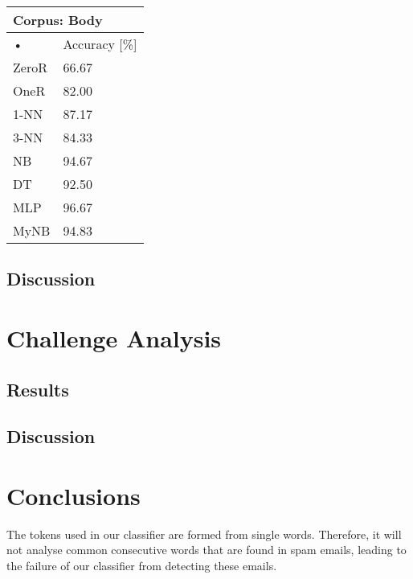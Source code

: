 \documentclass[10pt, a4paper]{article}
\begin{document}
\begin{tabular}{|l|l|}
\hline
\multicolumn{2}{|l|}{Corpus: Body} \\
\hline
• & Accuracy [\%] \\
\hline
ZeroR & 66.67 \\
\hline
OneR & 82.00 \\
\hline
1-NN & 87.17 \\
\hline
3-NN & 84.33 \\
\hline
NB & 94.67 \\
\hline
DT & 92.50 \\
\hline
MLP & 96.67 \\
\hline
MyNB & 94.83 \\
\hline
\end{tabular}

\subsection{Discussion}


\section{Challenge Analysis}


\subsection{Results}

\subsection{Discussion}

\section{Conclusions}

The tokens used in our classifier are formed from single words. Therefore, it will not analyse common consecutive words that are found in spam emails, leading to the failure of our classifier from detecting these emails.
\end{document}
